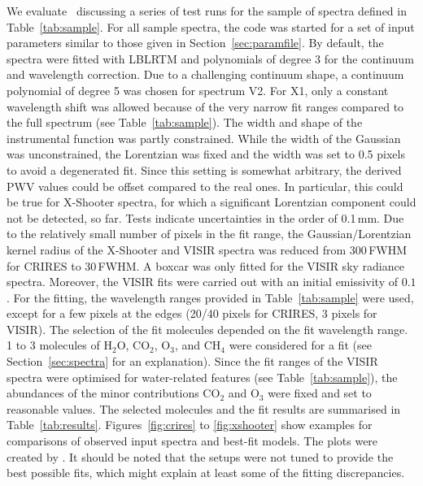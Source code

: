 We evaluate \mf\ discussing a series of test runs for the sample of spectra
defined in Table~\ref{tab:sample}. For all sample spectra, the code was started
for a set of input parameters similar to those given in
Section~\ref{sec:paramfile}. By default, the spectra were fitted with
\ac{LBLRTM} and polynomials of degree 3 for the continuum and wavelength
correction. Due to a challenging continuum shape, a continuum polynomial of
degree 5 was chosen for spectrum V2. For X1, only a constant wavelength shift
was allowed because of the very narrow fit ranges compared to the full
spectrum (see Table~\ref{tab:sample}). The width and shape of the instrumental
function was partly constrained. While the width of the Gaussian was
unconstrained, the Lorentzian was fixed and the width was set to 0.5 pixels to
avoid a degenerated fit. Since this setting is somewhat arbitrary, the derived
\ac{PWV} values could be offset compared to the real ones. In particular, this
could be true for X-Shooter spectra, for which a significant Lorentzian
component could not be detected, so far. Tests indicate uncertainties in the
order of 0.1\,mm. Due to the relatively small number of pixels in the fit
range, the Gaussian/Lorentzian kernel radius of the X-Shooter and VISIR spectra
was reduced from 300\,FWHM for CRIRES to 30\,FWHM. A boxcar was only fitted for
the VISIR sky radiance spectra. Moreover, the VISIR fits were carried out with
an initial emissivity of $0.1$. For the fitting, the wavelength ranges provided
in Table~\ref{tab:sample} were used, except for a few pixels at the edges
(20/40 pixels for CRIRES, 3 pixels for VISIR). The selection of the fit
molecules depended on the fit wavelength range. 1 to 3 molecules of H$_2$O,
CO$_2$, O$_3$, and CH$_4$ were considered for a fit (see
Section~\ref{sec:spectra} for an explanation). Since the fit ranges of the
VISIR spectra were optimised for water-related features (see
Table~\ref{tab:sample}), the abundances of the minor contributions CO$_2$ and
O$_3$ were fixed and set to reasonable values. The selected molecules and the
fit results are summarised in Table~\ref{tab:results}. Figures~\ref{fig:crires}
to \ref{fig:xshooter} show examples for comparisons of observed input spectra
and best-fit models. The plots were created by \mf. It should be noted that the
setups were not tuned to provide the best possible fits, which might explain at
least some of the fitting discrepancies.

